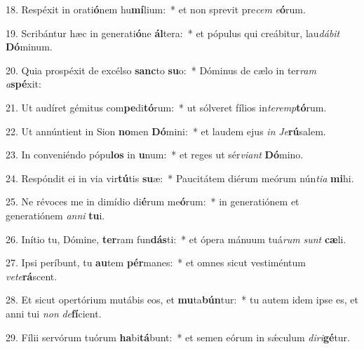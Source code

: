18. Respéxit in orati\textbf{ó}nem hu\textbf{mí}lium:~*  et non sprevit pre\textit{cem} \textit{e}\textbf{ó}rum.\

19. Scribántur hæc in generati\textbf{ó}ne \textbf{ál}tera:~*  et pópulus qui creábitur, lau\textit{dá}\textit{bit} \textbf{Dó}minum.\

20. Quia prospéxit de excélso \textbf{sanc}to \textbf{su}o:~*  Dóminus de cælo in ter\textit{ram} \textit{a}\textbf{spé}xit:\

21. Ut audíret gémitus com\textbf{pe}di\textbf{tó}rum:~*  ut sólveret fílios in\textit{ter}\textit{emp}\textbf{tó}rum.\

22. Ut annúntient in Sion \textbf{no}men \textbf{Dó}mini:~*  et laudem ejus \textit{in} \textit{Je}\textbf{rú}salem.\

23. In conveniéndo pópu\textbf{los} in \textbf{u}num:~*  et reges ut sér\textit{vi}\textit{ant} \textbf{Dó}mino.\

24. Respóndit ei in via vir\textbf{tú}tis \textbf{su}æ:~*  Paucitátem diérum meórum nún\textit{ti}\textit{a} \textbf{mi}hi.\

25. Ne révoces me in dimídio di\textbf{é}rum me\textbf{ó}rum:~*  in generatiónem et generatiónem \textit{an}\textit{ni} \textbf{tu}i.\

26. Inítio tu, Dómine, \textbf{ter}ram fun\textbf{dás}ti:~*  et ópera mánuum tuá\textit{rum} \textit{sunt} \textbf{cæ}li.\

27. Ipsi períbunt, tu \textbf{au}tem \textbf{pér}manes:~*  et omnes sicut vestiméntum \textit{ve}\textit{te}\textbf{rá}scent.\

28. Et sicut opertórium mutábis eos, et \textbf{mu}ta\textbf{bún}tur:~*  tu autem idem ipse es, et anni tui \textit{non} \textit{de}\textbf{fí}cient.\

29. Fílii servórum tuórum \textbf{ha}bi\textbf{tá}bunt:~*  et semen eórum in sǽculum \textit{di}\textit{ri}\textbf{gé}tur.\

